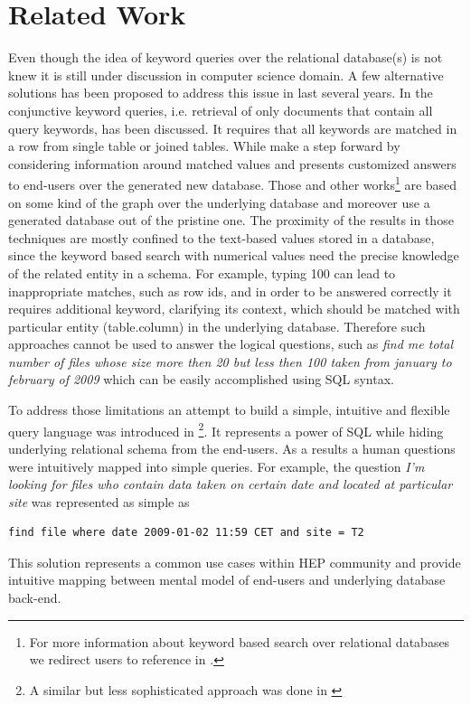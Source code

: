 \documentclass[a4paper]{jpconf}
\begin{document}
\section{Related Work\label{RelatedWork}}
Even though the idea of keyword queries over the relational database(s)
is not knew it is still under discussion in computer science domain.
A few alternative solutions has been proposed to address this issue
in last several years. In \cite{DBXplorer} the conjunctive keyword queries,
i.e. retrieval of only documents that contain all query keywords, has
been discussed. It requires that all keywords are matched in a row from
single table or joined tables. While \cite{QueryAnswer} make a step forward
by considering information around matched values and presents customized answers to
end-users over the generated new database. Those and other works\footnote{
For more information about
keyword based search over relational databases we redirect users to reference in
\cite{DBXplorer, QueryAnswer}.} 
are based on some kind of the graph over the underlying database and
moreover use a generated database out of the pristine one.
The proximity of the results in those techniques 
are mostly confined to the text-based values stored in a database, since the
keyword based search with numerical values 
need the precise knowledge of the related entity in a schema. For example, typing
100 can lead to inappropriate matches, such as row ids, and in order to be
answered correctly it requires additional keyword, clarifying its context, 
which should be matched with particular
entity (table.column) in the underlying database.
Therefore such approaches cannot be used to answer the logical questions, such as  
{\it find me total number of files whose size more then 20 but less then 
100 taken from january to february of 2009} which can be easily accomplished
using SQL syntax. 

To address those limitations an attempt to build a simple, intuitive and 
flexible query language was introduced in \cite{DBS-QL}\footnote{A similar but less
sophisticated approach was done in \cite{AMI}}.
It represents a power of SQL while hiding underlying relational schema from 
the end-users. As a results a human questions were intuitively mapped into 
simple queries. For example, the question
{\it I'm looking for files who contain data taken on certain date and located at
particular site} was represented as simple as \cite{DBS-QL}
\begin{verbatim}
find file where date 2009-01-02 11:59 CET and site = T2
\end{verbatim}
This solution represents a common use cases within HEP community and provide
intuitive mapping between mental model of end-users and underlying database back-end.
\end{document}
